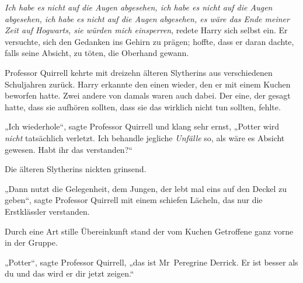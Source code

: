 \emph{Ich habe es nicht auf die Augen abgesehen, ich habe es nicht auf die Augen abgesehen, ich habe es nicht auf die Augen abgesehen, es wäre das Ende meiner Zeit auf Hogwarts, sie würden mich einsperren}, redete Harry sich selbst ein. Er versuchte, sich den Gedanken ins Gehirn zu prägen; hoffte, dass er daran dachte, falls seine Absicht, zu töten, die Oberhand gewann.

Professor Quirrell kehrte mit dreizehn älteren Slytherins aus verschiedenen Schuljahren zurück. Harry erkannte den einen wieder, den er mit einem Kuchen beworfen hatte. Zwei andere von damals waren auch dabei. Der eine, der gesagt hatte, dass sie aufhören sollten, dass sie das wirklich nicht tun sollten, fehlte.

„Ich wiederhole“, sagte Professor Quirrell und klang sehr ernst, „Potter wird \emph{nicht} tatsächlich verletzt. Ich behandle jegliche \emph{Unfälle} so, als wäre es Absicht gewesen. Habt ihr das verstanden?“

Die älteren Slytherins nickten grinsend.

„Dann nutzt die Gelegenheit, dem Jungen, der lebt mal eins auf den Deckel zu geben“, sagte Professor Quirrell mit einem schiefen Lächeln, das nur die Erstklässler verstanden.

Durch eine Art stille Übereinkunft stand der vom Kuchen Getroffene ganz vorne in der Gruppe.

„Potter“, sagte Professor Quirrell, „das ist Mr~Peregrine Derrick. Er ist besser als du und das wird er dir jetzt zeigen.“

